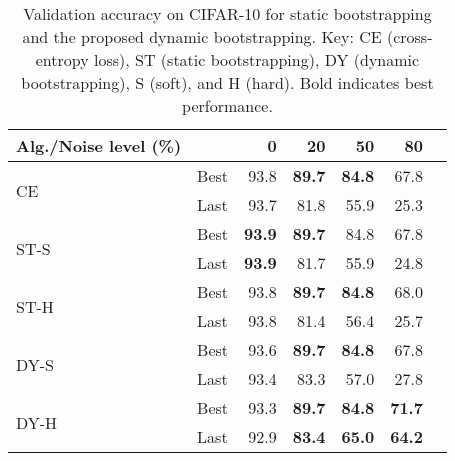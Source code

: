 \documentclass{article}
\providecommand{\tabularnewline}{\\}
\begin{document}
\begin{table}[t]
\begin{centering}
\caption{\label{tab:NmixDbootCIFAR}Validation accuracy on CIFAR-10 for static bootstrapping
and the proposed dynamic bootstrapping. Key: CE (cross-entropy loss), ST
(static bootstrapping), DY (dynamic bootstrapping), S (soft), and H
(hard). Bold indicates best performance.}
\vskip 0.15in 
\par\end{centering}
\begin{centering}
\begin{small}\begin{tabular}{llrrrrr}
\toprule 
Alg./Noise level (\%) &  & 0 & 20 & 50 & 80\tabularnewline
\hline 
\multirow{2}{*}{CE} & Best & 93.8 & \textbf{89.7} & \textbf{84.8} & 67.8\tabularnewline
 & Last & 93.7 & 81.8 & 55.9 & 25.3\tabularnewline
\midrule 
\multirow{2}{*}{ST-S} & Best & \textbf{93.9} & \textbf{89.7} & 84.8 & 67.8\tabularnewline
 & Last & \textbf{93.9} & 81.7 & 55.9 & 24.8\tabularnewline
\midrule 
\multirow{2}{*}{ST-H} & Best & 93.8 & \textbf{89.7} & \textbf{84.8} & 68.0\tabularnewline
 & Last & 93.8 & 81.4 & 56.4 & 25.7\tabularnewline
\midrule 
\multirow{2}{*}{DY-S} & Best & 93.6 & \textbf{89.7} & \textbf{84.8} & 67.8\tabularnewline
 & Last & 93.4 & 83.3 & 57.0 & 27.8\tabularnewline
\midrule 
\multirow{2}{*}{DY-H} & Best & 93.3 & \textbf{89.7} & \textbf{84.8} & \textbf{71.7}\tabularnewline
 & Last & 92.9 & \textbf{83.4} & \textbf{65.0} & \textbf{64.2}\tabularnewline
\bottomrule 
\end{tabular}\end{small}
\par\end{centering}
\centering{}\vskip -0.1in 
\end{table}
\end{document}
